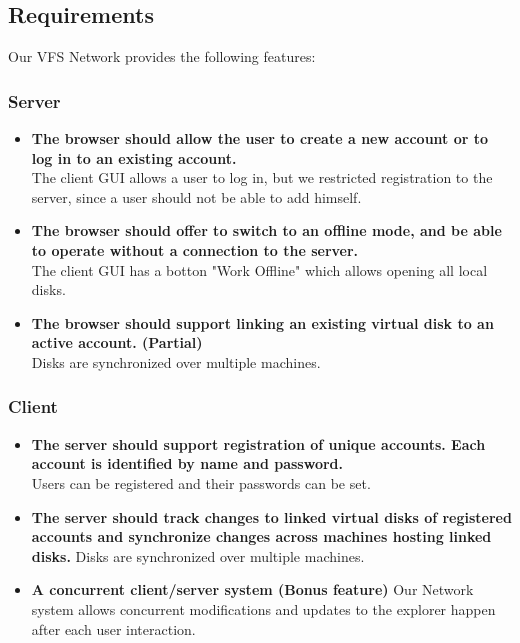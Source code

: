 \documentclass[a4paper,12pt]{article}
\begin{document}
\subsection{Requirements}
Our VFS Network provides the following features:

\subsubsection{Server}

\begin{itemize}
\item \textbf{The browser should allow the user to create a new account or to log in to an existing account.} \\
	The client GUI allows a user to log in, but we restricted registration to the server, since a user should not be able to add himself.
\item \textbf{ The browser should offer to switch to an offline mode, and be able to operate without a connection
to the server.} \\
	The client GUI has a botton "Work Offline" which allows opening all local disks.
\item \textbf{The browser should support linking an existing virtual disk to an active account. (Partial)} \\
	Disks are synchronized over multiple machines.
\end{itemize}

\subsubsection{Client}

\begin{itemize}
\item \textbf{ The server should support registration of unique accounts. Each account is identified by name and password.} \\
	Users can be registered and their passwords can be set.
\item \textbf { The server should track changes to linked virtual disks of registered accounts and synchronize
changes across machines hosting linked disks.}
	Disks are synchronized over multiple machines.
\item \textbf{A concurrent client/server system (Bonus feature)}
	Our Network system allows concurrent modifications and updates to the explorer happen after each user interaction.
\end{itemize}
\end{document}
